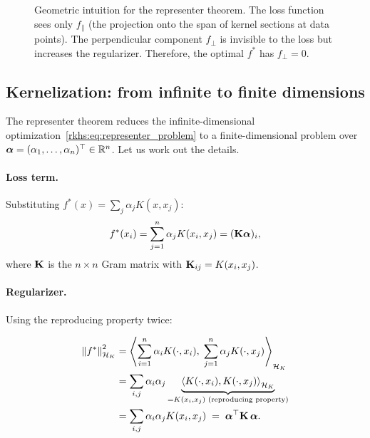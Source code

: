 \begin{notechapter}
\begin{figure}[ht]
\caption{Geometric intuition for the representer theorem. The loss
function sees only $f_\parallel$ (the projection onto the span of kernel
sections at data points). The perpendicular component $f_\perp$ is
invisible to the loss but increases the regularizer. Therefore, the
optimal $f^*$ has $f_\perp = 0$.}
\label{rkhs:fig:representer}
\end{figure}

\subsection{Kernelization: from infinite to finite dimensions}

The representer theorem reduces the infinite-dimensional
optimization~\eqref{rkhs:eq:representer_problem} to a finite-dimensional
problem over $\boldsymbol{\alpha} = (\alpha_1, \ldots, \alpha_n)^\top \in
\mathbb{R}^n$. Let us work out the details.

\paragraph{Loss term.} Substituting $f^*(x) = \sum_j \alpha_j K(x, x_j)$:
\[
f^*(x_i) = \sum_{j=1}^n \alpha_j K(x_i, x_j) = (\mathbf{K}\boldsymbol{\alpha})_i,
\]
where $\mathbf{K}$ is the $n \times n$ Gram matrix with $\mathbf{K}_{ij} =
K(x_i, x_j)$.

\paragraph{Regularizer.} Using the reproducing property twice:

\begin{align*}
\left\|f^*\right\|_{\mathcal{H}_K}^2 &=
\left\langle \sum_{i=1}^n \alpha_i K(\cdot, x_i),\;
\sum_{j=1}^n \alpha_j K(\cdot, x_j) \right\rangle_{\mathcal{H}_K} \nonumber \\
&= \sum_{i,j} \alpha_i \alpha_j
\underbrace{\left\langle K(\cdot, x_i), K(\cdot, x_j)
\right\rangle_{\mathcal{H}_K}}_{= K(x_i, x_j)
\text{ (reproducing property)}} \nonumber \\
&= \sum_{i,j} \alpha_i \alpha_j K(x_i, x_j) \;=\;
\boldsymbol{\alpha}^\top \mathbf{K}\, \boldsymbol{\alpha}. \label{rkhs:eq:rkhs_norm_alpha}
\end{align*}


\end{notechapter}
